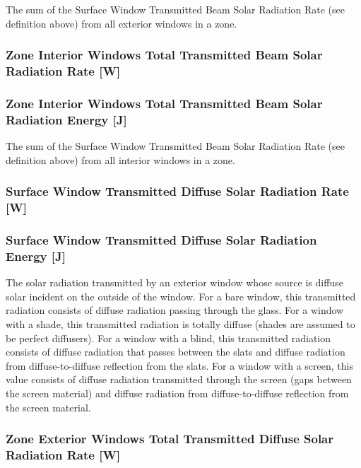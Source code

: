 The sum of the Surface Window Transmitted Beam Solar Radiation Rate (see definition above) from all exterior windows in a zone.

\subsubsection{Zone Interior Windows Total Transmitted Beam Solar Radiation Rate {[}W{]}}\label{zone-interior-windows-total-transmitted-beam-solar-radiation-rate-w}

\subsubsection{Zone Interior Windows Total Transmitted Beam Solar Radiation Energy {[}J{]}}\label{zone-interior-windows-total-transmitted-beam-solar-radiation-energy-j}

The sum of the Surface Window Transmitted Beam Solar Radiation Rate (see definition above) from all interior windows in a zone.

\subsubsection{Surface Window Transmitted Diffuse Solar Radiation Rate {[}W{]}}\label{surface-window-transmitted-diffuse-solar-radiation-rate-w}

\subsubsection{Surface Window Transmitted Diffuse Solar Radiation Energy {[}J{]}}\label{surface-window-transmitted-diffuse-solar-radiation-energy-j}

The solar radiation transmitted by an exterior window whose source is diffuse solar incident on the outside of the window. For a bare window, this transmitted radiation consists of diffuse radiation passing through the glass. For a window with a shade, this transmitted radiation is totally diffuse (shades are assumed to be perfect diffusers). For a window with a blind, this transmitted radiation consists of diffuse radiation that passes between the slats and diffuse radiation from diffuse-to-diffuse reflection from the slats. For a window with a screen, this value consists of diffuse radiation transmitted through the screen (gaps between the screen material) and diffuse radiation from diffuse-to-diffuse reflection from the screen material.

\subsubsection{Zone Exterior Windows Total Transmitted Diffuse Solar Radiation Rate {[}W{]}}\label{zone-exterior-windows-total-transmitted-diffuse-solar-radiation-rate-w}

